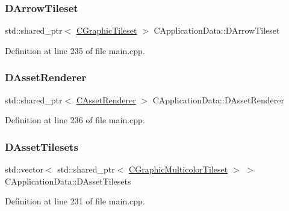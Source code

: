 \subsubsection{\texorpdfstring{D\+Arrow\+Tileset}{DArrowTileset}}
{\footnotesize\ttfamily std\+::shared\+\_\+ptr$<$ \hyperlink{classCGraphicTileset}{C\+Graphic\+Tileset} $>$ C\+Application\+Data\+::\+D\+Arrow\+Tileset\hspace{0.3cm}{\ttfamily [protected]}}



Definition at line 235 of file main.\+cpp.

\hypertarget{classCApplicationData_a5b42401441ae3a70fb4bd26f5dfdba01}{}\label{classCApplicationData_a5b42401441ae3a70fb4bd26f5dfdba01} 
\subsubsection{\texorpdfstring{D\+Asset\+Renderer}{DAssetRenderer}}
{\footnotesize\ttfamily std\+::shared\+\_\+ptr$<$ \hyperlink{classCAssetRenderer}{C\+Asset\+Renderer} $>$ C\+Application\+Data\+::\+D\+Asset\+Renderer\hspace{0.3cm}{\ttfamily [protected]}}



Definition at line 236 of file main.\+cpp.

\hypertarget{classCApplicationData_a1aaf56a300b30c5e2484a5359366d77a}{}\label{classCApplicationData_a1aaf56a300b30c5e2484a5359366d77a} 
\subsubsection{\texorpdfstring{D\+Asset\+Tilesets}{DAssetTilesets}}
{\footnotesize\ttfamily std\+::vector$<$ std\+::shared\+\_\+ptr$<$ \hyperlink{classCGraphicMulticolorTileset}{C\+Graphic\+Multicolor\+Tileset} $>$ $>$ C\+Application\+Data\+::\+D\+Asset\+Tilesets\hspace{0.3cm}{\ttfamily [protected]}}



Definition at line 231 of file main.\+cpp.

\hypertarget{classCApplicationData_a93e478c5552a527fe2d680cac8fc910d}{}\label{classCApplicationData_a93e478c5552a527fe2d680cac8fc910d} 
